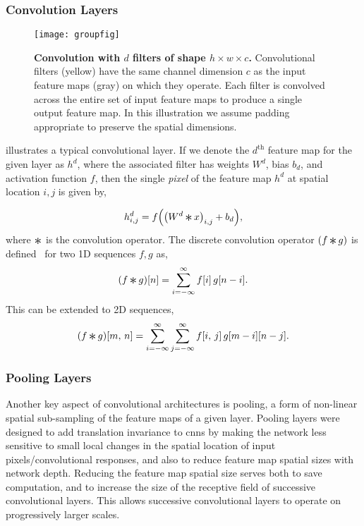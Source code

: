 \documentclass[thesis]{subfiles}
\begin{document}
\subsubsection{Convolution Layers}
\begin{figure}[tb]
	\centering
	\texttt{[image: groupfig]}
	\caption[Illustration of convolutional layer]{\textbf{Convolution with $d$ filters of shape $h\times w\times c$.} Convolutional filters (yellow) have the same channel dimension $c$ as the input feature maps (gray) on which they operate. Each filter is convolved across the entire set of input feature maps to produce a single output feature map. In this illustration we assume padding appropriate to preserve the spatial dimensions.}\label{fig:convlayer}
\end{figure}
%
 illustrates a typical convolutional layer. If we denote the $d^{\text{th}}$ feature map for the given layer as $h^d$, where the associated filter has weights $W^d$, bias $b_d$, and activation function $f$, then the single \emph{pixel} of the feature map $h^d$ at spatial location $i, j$ is given by,

\begin{equation}
	h^d_{i,j} = f{\left( {\left(W^d \convolution x \right)}_{i,j} + b_d \right)},
\end{equation}
%
where $\convolution$ is the convolution operator. The discrete convolution operator $(f \convolution g)$ is defined~\citep{damelin2011} for two 1D sequences $f, g$ as,
\begin{equation}
	(f \convolution g)[n] = \sum_{i=-\infty}^\infty f[i]\, g[n - i].
\end{equation}
%
This can be extended to 2D sequences,
\begin{equation}
(f \convolution g)[m,\,n] = \sum_{i=-\infty}^\infty \sum_{j=-\infty}^\infty f[i,\,j]\, g[m - i][n - j].
\end{equation}
%
\subsubsection{Pooling Layers}
Another key aspect of convolutional architectures is pooling, a form of non-linear spatial sub-sampling of the feature maps of a given layer. Pooling layers were designed to add translation invariance to \glspl{cnn} by making the network less sensitive to small local changes in the spatial location of input pixels/convolutional responses, and also to reduce feature map spatial sizes with network depth. Reducing the feature map spatial size serves both to save computation, and to increase the size of the receptive field of successive convolutional layers. This allows successive convolutional layers to operate on progressively larger scales.
\end{document}
